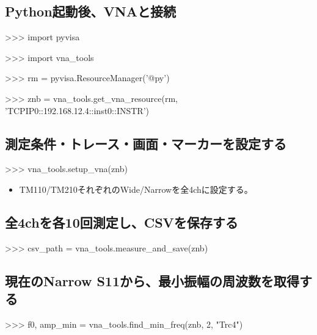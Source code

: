 \documentclass[a4paper,11pt]{ltjsarticle}
\begin{document}
\subsection{Python起動後、VNAと接続}

\begin{command}

>>> import pyvisa

>>> import vna_tools

>>> rm = pyvisa.ResourceManager('@py')

>>> znb = vna_tools.get_vna_resource(rm, 'TCPIP0::192.168.12.4::inst0::INSTR')

\end{command}

\subsection{測定条件・トレース・画面・マーカーを設定する}

\begin{command}

>>> vna_tools.setup_vna(znb)

\end{command}

\begin{itemize}

\item TM110/TM210それぞれのWide/Narrowを全4chに設定する。

\end{itemize}

\subsection{全4chを各10回測定し、CSVを保存する}

\begin{command}

>>> csv_path = vna_tools.measure_and_save(znb)

\end{command}

\subsection{現在のNarrow S11から、最小振幅の周波数を取得する}

\begin{command}

>>> f0, amp_min = vna_tools.find_min_freq(znb, 2, "Trc4")

\end{command}
\end{document}

